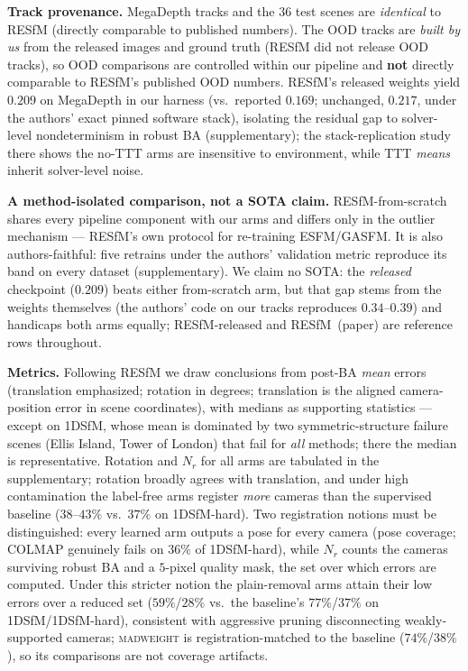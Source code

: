 \documentclass[10pt,twocolumn,letterpaper]{article}
\newcommand{\mad}{\textsc{madweight}}
\begin{document}
\noindent\textbf{Track provenance.} MegaDepth tracks and the 36 test scenes are
\emph{identical} to RESfM (directly comparable to published numbers). The OOD tracks
are \emph{built by us} from the released images and ground truth (RESfM did not release
OOD tracks), so OOD comparisons are controlled within our pipeline and \textbf{not}
directly comparable to RESfM's published OOD numbers. RESfM's released weights yield
$0.209$ on MegaDepth in our harness (vs.\ reported $0.169$; unchanged, $0.217$, under
the authors' exact pinned software stack), isolating the residual gap to solver-level
nondeterminism in robust BA (supplementary); the stack-replication study there shows
the no-TTT arms are insensitive to environment, while TTT \emph{means} inherit
solver-level noise.

\noindent\textbf{A method-isolated comparison, not a SOTA claim.}
RESfM-from-scratch shares every pipeline component with our arms and differs only in the
outlier mechanism --- RESfM's own protocol for re-training ESFM/GASFM. It is also
authors-faithful: five retrains under the authors' validation metric reproduce its band
on every dataset (supplementary). We claim no SOTA: the \emph{released} checkpoint
($0.209$) beats either from-scratch arm, but that gap stems from the weights themselves
(the authors' code on our tracks reproduces $0.34$--$0.39$) and handicaps both arms
equally; RESfM-released and RESfM~(paper) are reference rows throughout.

\noindent\textbf{Metrics.} Following RESfM we draw conclusions from post-BA
\emph{mean} errors (translation emphasized; rotation in degrees; translation is the
aligned camera-position error in scene coordinates), with medians as supporting
statistics --- except on 1DSfM, whose mean is dominated by two symmetric-structure
failure scenes (Ellis Island, Tower of London) that fail for \emph{all} methods; there
the median is representative. Rotation and $N_r$ for all arms are tabulated in the supplementary; rotation broadly
agrees with translation, and under high contamination the label-free arms register
\emph{more} cameras than the supervised baseline
($38$--$43\%$ vs.\ $37\%$ on 1DSfM-hard). Two registration notions must be distinguished:
every learned arm outputs a pose for every camera (pose coverage; COLMAP genuinely fails
on $36\%$ of 1DSfM-hard), while $N_r$ counts the cameras surviving robust BA and a
$5$-pixel quality mask, the set over which errors are computed. Under this stricter
notion the plain-removal arms attain their low errors over a reduced set ($59\%$/$28\%$
vs.\ the baseline's $77\%$/$37\%$ on 1DSfM/1DSfM-hard), consistent with aggressive
pruning disconnecting weakly-supported cameras; \mad{} is registration-matched to the
baseline ($74\%$/$38\%$), so its comparisons are not coverage artifacts.
\end{document}

